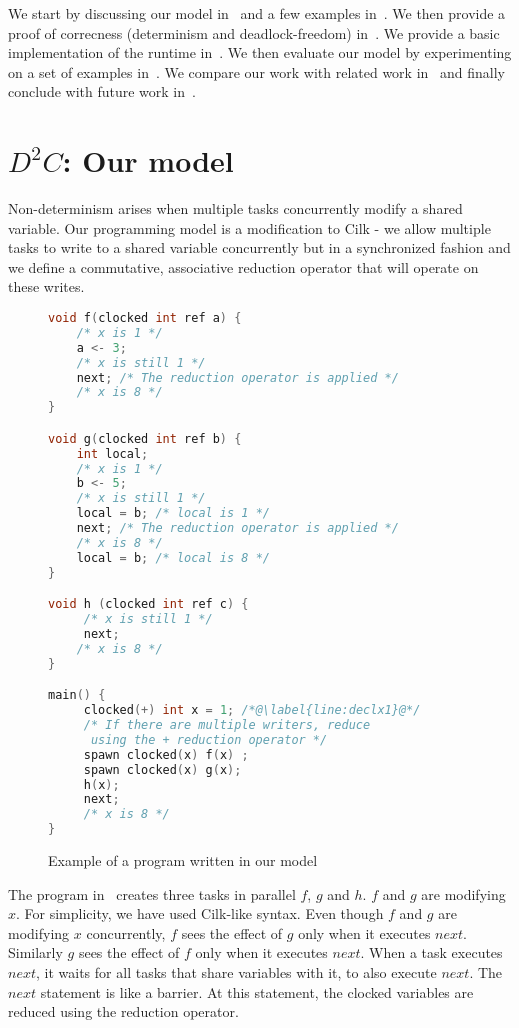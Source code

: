 \documentclass[10pt, conference, compsocconf]{IEEEtran}
\begin{document}
We start by discussing our model in~ and a few examples in~. 
We then provide a  proof of correcness (determinism and deadlock-freedom) in~. 
We provide a basic implementation of the runtime in~. 
We then evaluate our model by experimenting on a set of examples in~. 
We compare our work with related work in~ and finally conclude with future work in~.



\section{$D^2C$: Our model}
\label{sec:model}

Non-determinism arises when multiple tasks concurrently modify a shared variable.
Our programming model is a modification to Cilk - we allow multiple tasks to write to
a shared variable concurrently but in a synchronized fashion and we define a commutative, associative
reduction operator that will operate on these
writes.
\begin{figure}
\begin{lstlisting}[language=C]
void f(clocked int ref a) {
    /* x is 1 */
    a <- 3;
    /* x is still 1 */
    next; /* The reduction operator is applied */
    /* x is 8 */
}

void g(clocked int ref b) {
    int local;
    /* x is 1 */
    b <- 5;
    /* x is still 1 */
    local = b; /* local is 1 */
    next; /* The reduction operator is applied */
    /* x is 8 */
    local = b; /* local is 8 */
}

void h (clocked int ref c) {
     /* x is still 1 */
     next;
    /* x is 8 */
}

main() {
     clocked(+) int x = 1; /*@\label{line:declx1}@*/
     /* If there are multiple writers, reduce
      using the + reduction operator */
     spawn clocked(x) f(x) ;
     spawn clocked(x) g(x);
     h(x);
     next;
     /* x is 8 */
}
\end{lstlisting}
\caption{Example of a program written in our model}
\label{fig:ddc}
\end{figure}


The program in~ creates three tasks
in parallel $f$, $g$ and $h$. $f$ and $g$ are
modifying $x$.
For simplicity, we have used Cilk\cite{blumofe1995cilk}-like syntax.
Even though $f$ and $g$ are modifying
$x$ concurrently, $f$ sees the effect of $g$ only
when it executes $next$. Similarly $g$ sees the effect
of $f$ only when it executes $next$.
When a task executes $next$, it waits for all tasks that
share variables with it, to also execute $next$. The $next$
statement is like a barrier. At this statement, the clocked variables are reduced
using the reduction operator.
\end{document}
